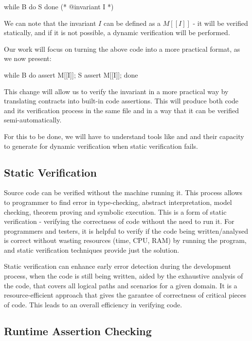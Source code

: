 \begin{gospel}
    while B do S done
    (* @invariant I *)
\end{gospel}

We can note that the invariant $I$ can be defined as a \monitor $M[[I]]$ - it will be verified statically, 
and if it is not possible, a dynamic verification will be performed.

Our work will focus on turning the above code into a more practical format, as we now present:

\begin{gospel}
    while B do
        assert M[[I]];
        S
        assert M[[I]];
    done
\end{gospel}

This change will allow us to verify the invariant in a more practical way by translating contracts 
into built-in code assertions. This will produce both code and its verification process in the 
same file and in a way that it can be verified semi-automatically. 

For this to be done, we will have to understand tools like \cameleer and \ortac and their capacity 
to generate \monitors for dynamic verification when static verification fails.

\subsection{Static Verification}
\label{sub:static_verification}

Source code can be verified without the machine running it. This process allows to programmer 
to find error in type-checking, abstract interpretation, model checking, theorem proving and symbolic execution.
This is a form of static verification - verifying the correctness of code without the need to run it.
For programmers and testers, it is helpful to verify if the code being written/analysed is correct without 
wasting resources (time, CPU, RAM) by running the program, and static verification techniques provide just the solution.

Static verification can enhance early error detection during the development process, when the code is still 
being written, aided by the exhaustive analysis of the code, that covers all logical paths and scenarios for 
a given domain. It is a resource-efficient approach that gives the garantee of correctness of critical 
pieces of code. This leads to an overall efficiency in verifying code.

\subsection{Runtime Assertion Checking}
\label{sub:rac}

